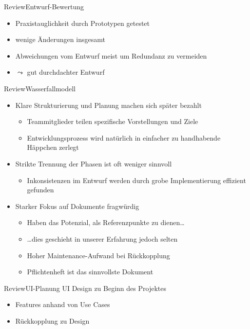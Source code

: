 \documentclass[10pt]{beamer}
\begin{document}
\begin{frame}{Review}{Entwurf-Bewertung}
	\begin{itemize}
		\item Praxistauglichkeit durch Prototypen getestet
		\item wenige Änderungen insgesamt
		\item Abweichungen vom Entwurf meist um Redundanz zu vermeiden
		\item [] $\leadsto$ gut durchdachter Entwurf
	\end{itemize}
\end{frame}

\begin{frame}{Review}{Wasserfallmodell}
	\begin{itemize}
		\item Klare Strukturierung und Planung machen sich später bezahlt
			\begin{itemize}
				\item Teammitglieder teilen spezifische Vorstellungen und Ziele
				\item Entwicklungsprozess wird natürlich in einfacher zu handhabende
					Häppchen zerlegt
			\end{itemize}
		\item Strikte Trennung der Phasen ist oft weniger sinnvoll
			\begin{itemize}
				\item Inkonsistenzen im Entwurf werden durch grobe Implementierung
					effizient gefunden
			\end{itemize}
		\item Starker Fokus auf Dokumente fragwürdig
			\begin{itemize}
				\item Haben das Potenzial, als Referenzpunkte zu dienen\ldots
				\item \ldots dies geschieht in unserer Erfahrung jedoch selten
				\item Hoher Maintenance-Aufwand bei Rückkopplung
				\item Pflichtenheft ist das sinnvollste Dokument
			\end{itemize}
	\end{itemize}
\end{frame}

\begin{frame}{Review}{UI-Planung}
UI Design zu Beginn des Projektes
	\begin{itemize}
		\item Features anhand von Use Cases
		\item Rückkopplung zu Design
	\end{itemize}
\end{frame}
\end{document}
